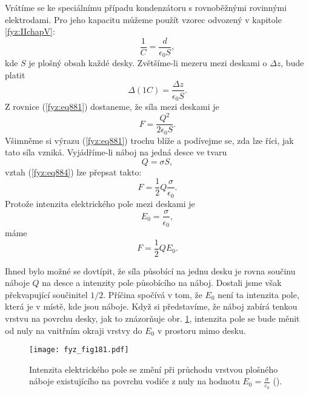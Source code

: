     Vrátíme se ke speciálnímu případu kondenzátoru s rovnoběžnými rovinnými elektrodami. Pro jeho
    kapacitu můžeme použít vzorec odvozený v kapitole \ref{fyz:IIchapV}:
    \begin{equation}\label{fyz:eq883}
      \dfrac{1}{C}=\dfrac{d}{ϵ_0S},
    \end{equation}
    kde \(S\) je plošný obsah každé desky. Zvětšíme-li mezeru mezi deskami o \(\Delta z\), bude
    platit
    \begin{equation*}
      Δ\left(1C\right)=\dfrac{Δz}{ϵ_0S}.
    \end{equation*}
    Z rovnice (\ref{fyz:eq881}) dostaneme, že síla mezi deskami je
    \begin{equation}\label{fyz:eq884}
      F=\dfrac{Q^2}{2ϵ_0S}.
    \end{equation}
    Všimněme si výrazu (\ref{fyz:eq881}) trochu blíže a podívejme se, zda lze říci, jak tato síla
    vzniká. Vyjádříme-li náboj na jedná desce ve tvaru
    \begin{equation*}
      Q=σS,
    \end{equation*}
    vztah (\ref{fyz:eq884}) lze přepsat takto:
    \begin{equation*}
      F=\dfrac{1}{2}Q\dfrac{σ}{ϵ_0}.
    \end{equation*}
    Protože intenzita elektrického pole mezi deskami je
    \begin{equation*}
      E_0=\dfrac{σ}{ϵ_0},
    \end{equation*}
    máme
    \begin{equation}\label{fyz:eq885}
      F=\dfrac{1}{2}QE_0.
    \end{equation}

    Ihned bylo možné se dovtípit, že síla působící na jednu desku je rovna součinu náboje \(Q\) na
    desce a intenzity pole působícího na náboj. Dostali jsme však překvapující součinitel \(1/2\).
    Příčina spočívá v tom, že \(E_0\) není ta intenzita pole, která je v místě, kde jsou náboje.
    Když si představíme, že náboj zabírá tenkou vrstvu na povrchu desky, jak to znázorňuje obr.
    \ref{fyz:fig181}, intenzita pole se bude měnit od nuly na vnitřním okraji vrstvy do \(E_0\) v
    prostoru mimo desku.
    
    \begin{figure}[ht!]  %
      \centering
      \texttt{[image: fyz\_fig181.pdf]}
      \caption{Intenzita elektrického pole se změní při průchodu vrstvou plošného náboje
              existujícího na povrchu vodiče z nuly na hodnotu \(E_0 =
              \frac{\sigma}{\varepsilon_0}\) (\cite[s.~145]{Feynman02}).}
      \label{fyz:fig181}
    \end{figure}

